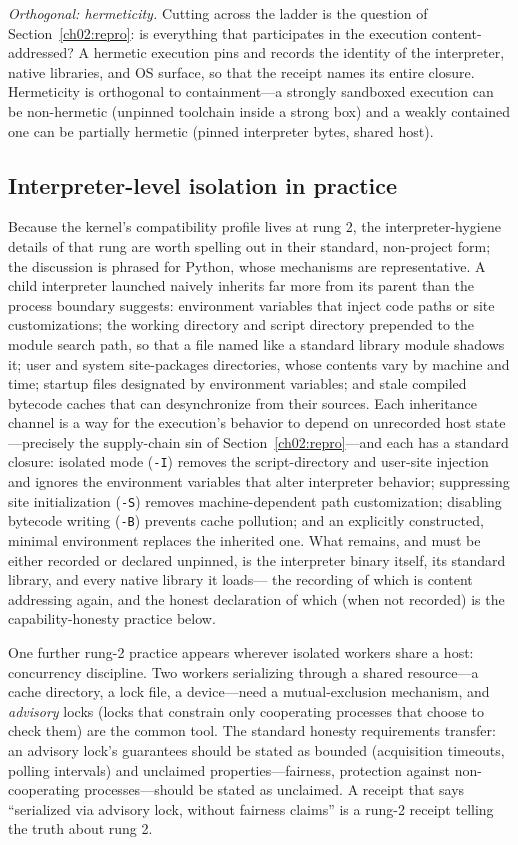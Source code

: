 \emph{Orthogonal: hermeticity.} Cutting across the ladder is the
question of Section~\ref{ch02:repro}: is everything that
participates in the execution content-addressed? A hermetic
execution pins and records the identity of the interpreter, native
libraries, and OS surface, so that the receipt names its entire
closure. Hermeticity is orthogonal to containment---a strongly
sandboxed execution can be non-hermetic (unpinned toolchain inside
a strong box) and a weakly contained one can be partially hermetic
(pinned interpreter bytes, shared host).

\subsection{Interpreter-level isolation in practice}\label{ch02:interp}

Because the kernel's compatibility profile lives at rung 2, the
interpreter-hygiene details of that rung are worth spelling out in
their standard, non-project form; the discussion is phrased for
Python, whose mechanisms are representative. A child interpreter
launched naively inherits far more from its parent than the
process boundary suggests: environment variables that inject code
paths or site customizations; the working directory and script
directory prepended to the module search path, so that a file
named like a standard library module shadows it; user and system
site-packages directories, whose contents vary by machine and
time; startup files designated by environment variables; and stale
compiled bytecode caches that can desynchronize from their
sources. Each inheritance channel is a way for the execution's
behavior to depend on unrecorded host state---precisely the
supply-chain sin of Section~\ref{ch02:repro}---and each has a
standard closure: isolated mode (\texttt{-I}) removes the
script-directory and user-site injection and ignores the
environment variables that alter interpreter behavior; suppressing
site initialization (\texttt{-S}) removes machine-dependent path
customization; disabling bytecode writing (\texttt{-B}) prevents
cache pollution; and an explicitly constructed, minimal
environment replaces the inherited one. What remains, and must be
either recorded or declared unpinned, is the interpreter binary
itself, its standard library, and every native library it loads---
the recording of which is content addressing again, and the honest
declaration of which (when not recorded) is the capability-honesty
practice below.

One further rung-2 practice appears wherever isolated workers share
a host: concurrency discipline. Two workers serializing through a
shared resource---a cache directory, a lock file, a device---need a
mutual-exclusion mechanism, and \emph{advisory} locks (locks that
constrain only cooperating processes that choose to check them) are
the common tool. The standard honesty requirements transfer: an
advisory lock's guarantees should be stated as bounded (acquisition
timeouts, polling intervals) and unclaimed properties---fairness,
protection against non-cooperating processes---should be stated as
unclaimed. A receipt that says ``serialized via advisory lock,
without fairness claims'' is a rung-2 receipt telling the truth
about rung 2.

